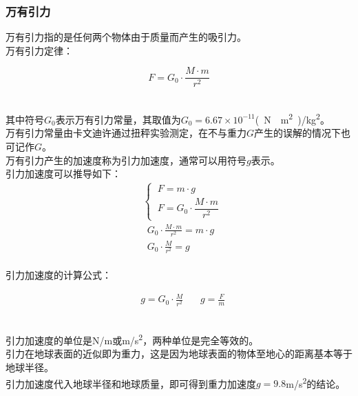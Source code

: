 \documentclass[UTF8]{ctexart}
\begin{document}
\subsubsection{万有引力}
    \setcounter{equation}{0}
    万有引力指的是任何两个物体由于质量而产生的吸引力。\\[3mm]
    万有引力定律：
    \begin{large}
        \begin{equation*}
            F=G_0\cdot\frac{M\cdot m}{r^2}
        \end{equation*}
    \end{large}\\
    其中符号$G_0$表示万有引力常量，其取值为$G_0=6.67\times 10^{-11}$\si{(N\cdot m^2)/kg^2}。\\[3mm]
    万有引力常量由卡文迪许通过扭秤实验测定，在不与重力$G$产生的误解的情况下也可记作$G$。\\[3mm]
    万有引力产生的加速度称为引力加速度，通常可以用符号$g$表示。\\[3mm]
    引力加速度可以推导如下：
    \begin{align}
        &\begin{cases}
            ~F=m\cdot g\\[1mm]
            ~F=G_0\cdot\dfrac{M\cdot m}{r^2}
        \end{cases}\\[2mm]
        &~~G_0\cdot\frac{M\cdot m}{r^2}=m\cdot g\\[2mm]
        &~~G_0\cdot\frac{M}{r^2}=g
    \end{align}\\
    引力加速度的计算公式：
    \begin{large}
        \begin{align*}
            &g=G_0\cdot\frac{M}{r^2}~~~~~~~~g=\frac{F}{m}
        \end{align*}
    \end{large}\\
    引力加速度的单位是\si{N/m}或\si{m/s^2}，两种单位是完全等效的。\\[3mm]
    引力在地球表面的近似即为重力，这是因为地球表面的物体至地心的距离基本等于地球半径。\\[3mm]
    引力加速度代入地球半径和地球质量，即可得到重力加速度$g=9.8$\si{m/s^2}的结论。
    
\newpage
\end{document}
